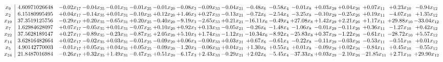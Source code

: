 \documentclass[9pt]{article}
\begin{document}
 \[\begin{array}{c| c c@{\hskip 2pt} c@{\hskip 2pt} c@{\hskip 2pt} c@{\hskip 2pt} c@{\hskip 2pt} c@{\hskip 2pt} c@{\hskip 2pt} c@{\hskip 2pt} c@{\hskip 2pt} c@{\hskip 2pt} c@{\hskip 2pt} c@{\hskip 2pt} c@{\hskip 2pt} c@{\hskip 2pt} c@{\hskip 2pt} c@{\hskip 2pt} }
 x_{9}   &  4.60971026648 & -0.02 x_{17} & -0.04 x_{35} & -0.01 x_{31} & -0.01 x_{25} & -0.01 x_{20} & -0.08 x_{3} & -0.09 x_{33} & -0.04 x_{21} & -0.48 x_{6} & -0.58 x_{4} & -0.01 x_{8} & +  0.03 x_{29} & +  0.04 x_{26} & +  0.07 x_{11} & +  0.23 x_{10} & -0.94 x_{12}\\
 x_{2}   &  6.15180995495 & +  0.04 x_{17} & -0.14 x_{35} & +  0.01 x_{31} & -0.10 x_{25} & +  0.12 x_{20} & +  1.46 x_{3} & +  0.27 x_{33} & -0.13 x_{21} & -0.72 x_{6} & -2.54 x_{4} & -3.25 x_{8} & -0.10 x_{29} & -0.25 x_{26} & +  0.19 x_{11} & -4.07 x_{10} & +  1.35 x_{12}\\
 x_{19}   &  37.3519125756 & -0.29 x_{17} & +  0.20 x_{35} & -0.65 x_{31} & +  0.20 x_{25} & -0.40 x_{20} & -9.19 x_{3} & -2.65 x_{33} & +  0.21 x_{21} & -16.11 x_{6} & -0.49 x_{4} & + 27.08 x_{8} & +  1.42 x_{29} & +  2.21 x_{26} & +  1.17 x_{11} & + 29.88 x_{10} & -33.04 x_{12}\\
 x_{7}   &  1.62984628097 & +  0.07 x_{17} & -0.05 x_{35} & +  0.01 x_{31} & -0.07 x_{25} & +  0.10 x_{20} & +  0.92 x_{3} & +  0.13 x_{33} & -0.05 x_{21} & -0.26 x_{6} & -1.48 x_{4} & -1.06 x_{8} & -0.01 x_{29} & -0.11 x_{26} & +  0.36 x_{11} & -1.27 x_{10} & +  0.42 x_{12}\\
 x_{22}   &  37.5628189147 & +  0.27 x_{17} & -0.89 x_{35} & -0.23 x_{31} & -0.87 x_{25} & +  2.05 x_{20} & +  5.10 x_{3} & +  1.74 x_{33} & -1.12 x_{21} & -10.34 x_{6} & -8.92 x_{4} & -25.83 x_{8} & +  0.37 x_{29} & -1.22 x_{26} & -0.61 x_{11} & -28.72 x_{10} & +  5.57 x_{12}\\
 x_{14}   &  3.62816482664 & +  0.02 x_{17} & -0.02 x_{35} & +  0.03 x_{31} & -0.01 x_{25} & -0.09 x_{20} & +  0.06 x_{3} & -0.00 x_{33} & +  0.03 x_{21} & +  0.67 x_{6} & -0.61 x_{4} & -0.22 x_{8} & -0.11 x_{29} & -0.03 x_{26} & -0.53 x_{11} & -0.51 x_{10} & +  0.01 x_{12}\\
 x_{5}   &  4.90142770003 & -0.01 x_{17} & +  0.05 x_{35} & +  0.04 x_{31} & +  0.05 x_{25} & -0.09 x_{20} & -1.20 x_{3} & -0.06 x_{33} & +  0.04 x_{21} & +  1.30 x_{6} & +  0.55 x_{4} & +  0.01 x_{8} & -0.09 x_{29} & +  0.02 x_{26} & -0.84 x_{11} & +  0.45 x_{10} & -0.55 x_{12}\\
 x_{24}   &  21.8487016984 & -0.26 x_{17} & +  0.32 x_{35} & +  1.49 x_{31} & -0.47 x_{25} & +  0.51 x_{20} & -6.17 x_{3} & +  2.43 x_{33} & -0.29 x_{21} & +  2.02 x_{6} & -5.45 x_{4} & -37.33 x_{8} & +  0.03 x_{29} & -2.10 x_{26} & -21.85 x_{11} & +  2.71 x_{10} & + 29.90 x_{12}\\

\end{array}\]
\end{document}
